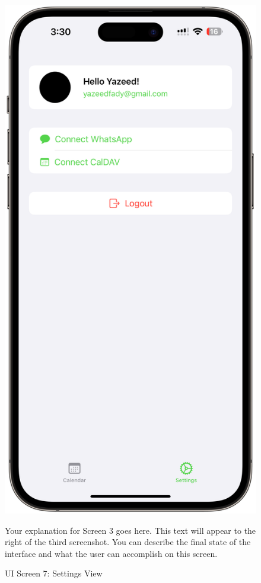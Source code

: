 \begin{figure}[!h]
    \begin{minipage}{0.3\textwidth}
        \centering
        \includegraphics[width=\textwidth]{images/screen7.png}
        \caption{UI Screen 7: Settings View}
        \label{fig:ui-screen-7}
    \end{minipage}
    \hfill
    \begin{minipage}{0.65\textwidth}
        Your explanation for Screen 3 goes here. This text will appear to the right 
        of the third screenshot. You can describe the final state of the interface 
        and what the user can accomplish on this screen.
    \end{minipage}
\end{figure}